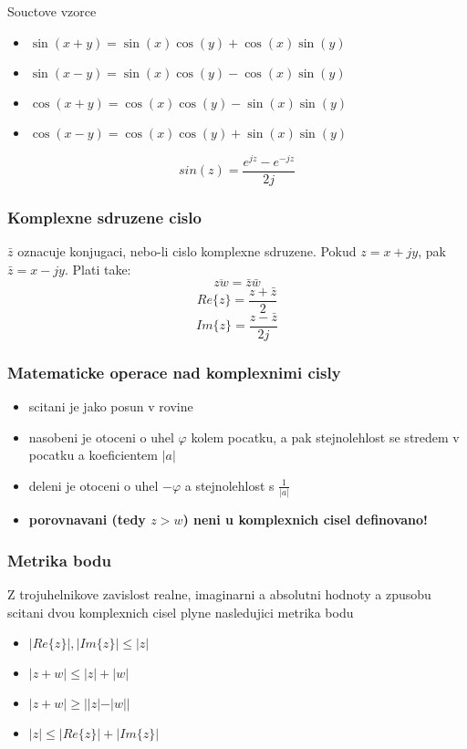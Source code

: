 Souctove vzorce
\begin{itemize}
\item $\operatorname{sin}(x+y)=\operatorname{sin}(x)\operatorname{cos}(y)+\operatorname{cos}(x)\operatorname{sin}(y)$
\item $\operatorname{sin}(x-y)=\operatorname{sin}(x)\operatorname{cos}(y)-\operatorname{cos}(x)\operatorname{sin}(y)$
\item $\operatorname{cos}(x+y)=\operatorname{cos}(x)\operatorname{cos}(y)-\operatorname{sin}(x)\operatorname{sin}(y)$
\item $\operatorname{cos}(x-y)=\operatorname{cos}(x)\operatorname{cos}(y)+\operatorname{sin}(x)\operatorname{sin}(y)$
\end{itemize}
\begin{equation}
\label{eq:sine}
sin(z) = \frac{e^{jz}-e^{-jz}}{2j}
\end{equation}
\begin{equation}
\label{eq:cose}
\end{equation}
\subsubsection*{Komplexne sdruzene cislo}
$\bar{z}$ oznacuje konjugaci, nebo-li cislo komplexne sdruzene. Pokud $z=x+jy$, pak $\bar{z}=x-jy$. Plati take:
$$\overline{zw}=\bar{z}\bar{w}$$
$$Re\{z\} = \frac{z+\bar{z}}{2}$$
$$Im\{z\} = \frac{z-\bar{z}}{2j}$$

\subsubsection*{Matematicke operace nad komplexnimi cisly}
\begin{itemize}
\item scitani je jako posun v rovine
\item nasobeni je otoceni o uhel $\varphi$ kolem pocatku, a pak stejnolehlost se stredem v pocatku a koeficientem $|a|$
\item deleni je otoceni o uhel $-\varphi$ a stejnolehlost s $\frac{1}{|a|}$
\item \textbf{porovnavani (tedy $z>w$) neni u komplexnich cisel definovano!}
\end{itemize}

\subsubsection*{Metrika bodu}
Z trojuhelnikove zavislost realne, imaginarni a absolutni hodnoty a zpusobu scitani dvou komplexnich cisel plyne nasledujici metrika bodu 
\begin{itemize}
\item $|Re\{z\}|,|Im\{z\}| \leq |z|$
\item $|z+w| \leq |z| + |w|$
\item $|z+w| \geq ||z|-|w||$
\item $|z| \leq |Re\{z\}|+|Im\{z\}|$
\end{itemize}

